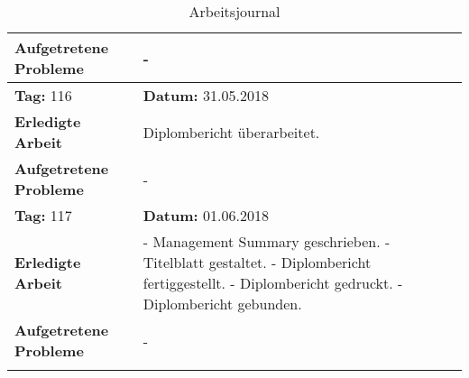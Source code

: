 \begin{longtable}{|p{5cm}|p{5cm}p{6cm}|}
\textbf{Aufgetretene Probleme} & \multicolumn{2}{p{11cm}|}{-} \\ \hline
\rowcolor{heading}\textbf{Tag:} 116 & \textbf{Datum:} 31.05.2018 & \\ \hline
\textbf{Erledigte Arbeit} & \multicolumn{2}{p{11cm}|}{Diplombericht überarbeitet.} \\ \hline
\textbf{Aufgetretene Probleme} & \multicolumn{2}{p{11cm}|}{-} \\ \hline
\rowcolor{heading}\textbf{Tag:} 117 & \textbf{Datum:} 01.06.2018 & \\ \hline
\textbf{Erledigte Arbeit} & \multicolumn{2}{p{11cm}|}{- Management Summary geschrieben. \newline
- Titelblatt gestaltet. \newline
- Diplombericht fertiggestellt. \newline
- Diplombericht gedruckt. \newline
- Diplombericht gebunden.} \\ \hline
\textbf{Aufgetretene Probleme} & \multicolumn{2}{p{11cm}|}{-} \\ \hline
\caption{Arbeitsjournal}\\
\end{longtable}


